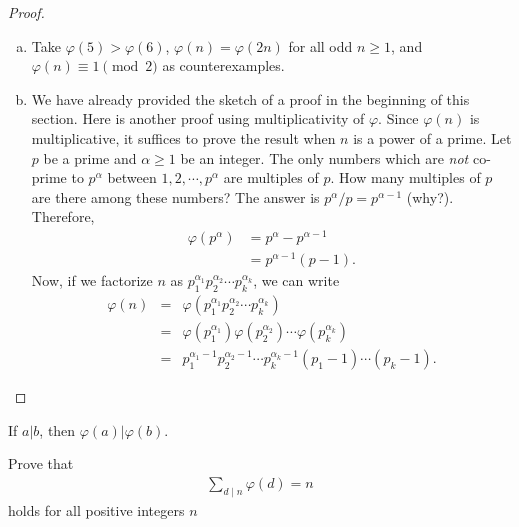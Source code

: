 \documentclass[12pt]{subfile}
\begin{document}
\begin{proof}
\begin{enumerate}[(a)]
				\item Take $\varphi(5)>\varphi(6)$, $\varphi(n)=\varphi(2n)$ for all odd $n\geq 1$, and $\varphi(n) \equiv 1 \pmod 2$ as counterexamples.

				\item We have already provided the sketch of a proof in the beginning of this section. Here is another proof using multiplicativity of $\varphi$. Since $\varphi(n)$ is multiplicative, it suffices to prove the result when $n$ is a power of a prime. Let $p$ be a prime and $\alpha \geq 1$ be an integer. The only numbers which are \textit{not} co-prime to $p^\alpha$ between $1,2,\cdots,p^\alpha$ are multiples of $p$. How many multiples of $p$ are there among these numbers? The answer is $p^\alpha/p=p^{\alpha-1}$ (why?). Therefore,
					\begin{align*}
						\varphi(p^\alpha) &= p^\alpha - p^{\alpha -1}\\
						&= p^{\alpha -1} (p-1).
					\end{align*}
				Now, if we factorize $n$ as $p_1^{\alpha_1} p_2^{\alpha_2} \cdots p_k^{\alpha_k}$, we can write
					\begin{eqnarray*}
						\varphi(n) &=& \varphi(p_1^{\alpha_1} p_2^{\alpha_2} \cdots p_k^{\alpha_k})\\
								   &=& \varphi(p_1^{\alpha_1}) \varphi(p_2^{\alpha_2}) \cdots \varphi(p_k^{\alpha_k})\\
								   &=& p_1^{\alpha_1-1} p_2^{\alpha_2-1} \cdots p_k^{\alpha_k-1} \left( p_1 -1 \right) \cdots \left( p_k -1 \right).
					\end{eqnarray*}
			\end{enumerate}
		\end{proof}

		\begin{corollary}\label{cor:phidiv}
			If $a|b$, then $\varphi(a)|\varphi(b)$.
		\end{corollary}

		\begin{theorem}\label{thm:phi*1}
			Prove that
				\begin{align*}
					\sum_{d\mid n} \varphi(d)=n
				\end{align*}
			holds for all positive integers $n$
		\end{theorem}
\end{document}
